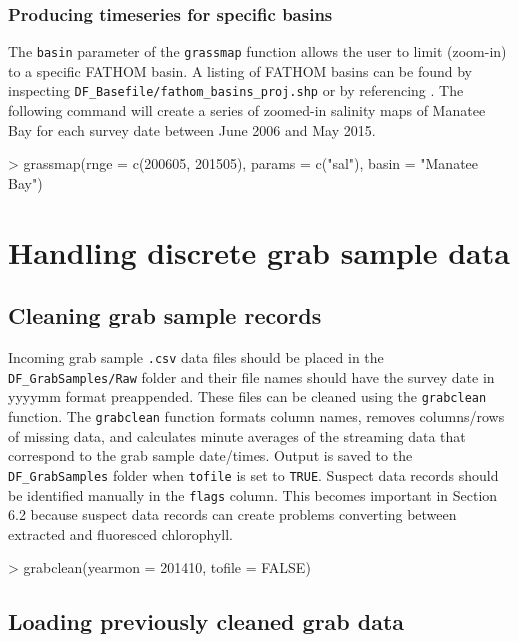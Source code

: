 \documentclass[12pt]{article}
\begin{document}
\subsubsection{Producing timeseries for specific basins}

The \texttt{basin} parameter of the \texttt{grassmap} function allows the user to limit (zoom-in) to a specific FATHOM basin. A listing of FATHOM basins can be found by inspecting \verb|DF_Basefile/fathom_basins_proj.shp| or by referencing \citet{cosby2005fathom}. The following command will create a series of zoomed-in salinity maps of Manatee Bay for each survey date between June 2006 and May 2015.   

\begin{Schunk}
\begin{Sinput}
> grassmap(rnge = c(200605, 201505), params = c("sal"), basin = "Manatee Bay")
\end{Sinput}
\end{Schunk}


\section{Handling discrete grab sample data}
\subsection{Cleaning grab sample records}
Incoming grab sample \texttt{.csv} data files should be placed in the \verb|DF_GrabSamples/Raw| folder and their file names should have the survey date in yyyymm format preappended. These files can be cleaned using the \texttt{grabclean} function. The \texttt{grabclean} function formats column names, removes columns/rows of missing data, and calculates minute averages of the streaming data that correspond to the grab sample date/times. Output is saved to the \verb|DF_GrabSamples| folder when \texttt{tofile} is set to \texttt{TRUE}. Suspect data records should be identified manually in the \texttt{flags} column. This becomes important in Section 6.2 because suspect data records can create problems converting between extracted and fluoresced chlorophyll.

\begin{Schunk}
\begin{Sinput}
> grabclean(yearmon = 201410, tofile = FALSE)
\end{Sinput}
\end{Schunk}

\subsection{Loading previously cleaned grab data}
\end{document}
